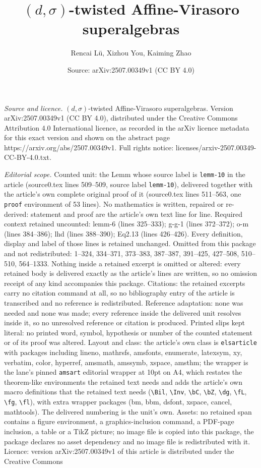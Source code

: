 \documentclass[10pt,a4paper]{amsart}
\title[$(d,\sigma)$-twisted Affine-Virasoro superalgebras]{$(d,\sigma)$-twisted Affine-Virasoro superalgebras}
\author{Rencai L\"u, Xizhou You, Kaiming Zhao}
\date{Source: arXiv:2507.00349v1 (CC BY 4.0)}
\begin{document}
\maketitle

\noindent\emph{Source and licence.} $(d,\sigma)$-twisted Affine-Virasoro superalgebras. Version arXiv:2507.00349v1 (CC BY 4.0), distributed under the Creative Commons Attribution 4.0 International licence, as recorded in the arXiv licence metadata for this exact version and shown on the abstract page https://arxiv.org/abs/2507.00349v1. Full rights notice: licenses/arxiv-2507.00349-CC-BY-4.0.txt.\par\smallskip

\noindent\textit{Editorial scope.} Counted unit: the Lemm whose source label is \texttt{lemm-10} in the article (source0.tex lines 509--509, source label \texttt{lemm-10}), delivered together with the article's own complete original proof of it (source0.tex lines 511--563, one \texttt{proof} environment of 53 lines). No mathematics is written, repaired or re-derived: statement and proof are the article's own text line for line. Required context retained uncounted: lemm-6 (lines 325--333); g-g-1 (lines 372--372); o-m (lines 384--386); lhd (lines 388--390); Eq2.13 (lines 426--426). Every definition, display and label of those lines is retained unchanged. Omitted from this package and not redistributed: 1--324, 334--371, 373--383, 387--387, 391--425, 427--508, 510--510, 564--1333. Nothing inside a retained excerpt is omitted or altered: every retained body is delivered exactly as the article's lines are written, so no omission receipt of any kind accompanies this package. Citations: the retained excerpts carry no citation command at all, so no bibliography entry of the article is transcribed and no reference is redistributed. Reference adaptation: none was needed and none was made; every reference inside the delivered unit resolves inside it, so no unresolved reference or citation is produced. Printed slips kept literal: no printed word, symbol, hypothesis or number of the counted statement or of its proof was altered. Layout and class: the article's own class is \texttt{elsarticle} with packages including lineno, mathrsfs, amsfonts, enumerate, latexsym, xy, verbatim, color, hyperref, amsmath, amssymb, xspace, amsthm; the wrapper is the lane's pinned \texttt{amsart} editorial wrapper at 10pt on A4, which restates the theorem-like environments the retained text needs and adds the article's own macro definitions that the retained text needs (\texttt{\textbackslash Bil}, \texttt{\textbackslash Inv}, \texttt{\textbackslash bC}, \texttt{\textbackslash bZ}, \texttt{\textbackslash dg}, \texttt{\textbackslash fL}, \texttt{\textbackslash fg}, \texttt{\textbackslash fl}), with extra wrapper packages (bm, bbm, dsfont, xspace, cancel, mathtools). The delivered numbering is the unit's own. Assets: no retained span contains a figure environment, a graphics-inclusion command, a PDF-page inclusion, a table or a TikZ picture; no image file is copied into this package, the package declares no asset dependency and no image file is redistributed with it. Licence: version arXiv:2507.00349v1 of this article is distributed under the Creative Commons 
\end{document}
